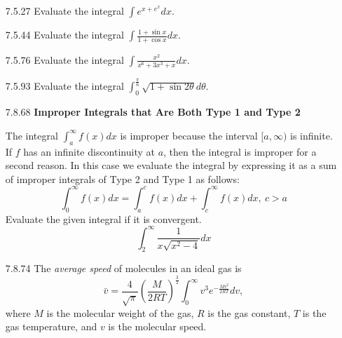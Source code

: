 \documentclass{article}
\begin{document}
\begin{enumerate}
    (a) $\displaystyle \int e^{x} \sqrt{e^{x}-1}dx$
    \hspace{1cm}
    (b) $\displaystyle \int \frac{e^{x}}{\sqrt{1-e^{2x}}}dx$
    \hspace{1cm}
    (c) $\displaystyle \int \frac{1}{\sqrt{e^{x}-1}}dx$

\vspace{6cm}

\item[7.5.27]
    Evaluate the integral $\displaystyle \int e^{x+e^{x}}dx$.

\vspace{6cm}

\item[7.5.44]
    Evaluate the integral $\displaystyle \int \frac{1+\sin x}{1+\cos x}dx$.

\newpage

\item[7.5.76]
    Evaluate the integral $\displaystyle \int \frac{x^{2}}{x^{6}+3x^{3}+x}dx$.

\vspace{5cm}

\item[7.5.93]
    Evaluate the integral
    $\displaystyle \int_{0}^{\frac{\pi}{6}}  \sqrt{1 + \sin 2\theta}d\theta$.

\vspace{5cm}

\item[7.8.68]
    \textbf{Improper Integrals that Are Both Type 1 and Type 2}

    The integral $\displaystyle \int_{a}^{\infty} f(x) dx $ is improper because
    the interval $[a, \infty)$ is infinite. If $f$ has an infinite
    discontinuity at $a$, then the integral is improper for a second
    reason. In this case we evaluate the integral by expressing it as a sum
    of improper integrals of Type 2 and Type 1 as follows:
    \[
        \int_{0}^{\infty} f(x) dx
        = \int_{a}^{c} f(x)dx + \int_{c}^{\infty} f(x)dx,\ c > a
    \]
    Evaluate the given integral if it is convergent.
    \[
        \int_{2}^{\infty} \frac{1}{x \sqrt{x^{2}-4}}dx
    \]

\newpage

\item[7.8.74]
    The \textit{average speed} of molecules in an ideal gas is
    \[
        \bar{v} = \frac{4}{\sqrt{\pi}} \left( \frac{M}{2RT} \right)^{\frac{3}{2}}
        \int_{0}^{\infty} v^{3}e^{-\frac{Mv^{2}}{2RT}} dv,
    \]
    where $M$ is the molecular weight of the gas, $R$ is the gas constant,
    $T$ is the gas temperature, and $v$ is the molecular speed.


\end{enumerate}
\end{document}
